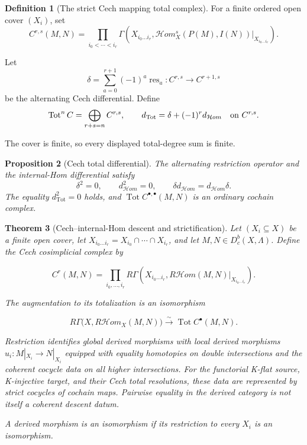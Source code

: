 \documentclass[10pt]{article}
\newtheorem{theorem}{Theorem}[section]
\newtheorem{proposition}[theorem]{Proposition}
\theoremstyle{definition}
\newtheorem{definition}[theorem]{Definition}
\newcommand{\Dbc}{D^b_c}
\begin{document}
\begin{definition}[The strict Cech mapping total complex]
For a finite ordered open cover \((X_i)\), set
\[
 C^{r,s}(M,N)=
 \prod_{i_0<\cdots<i_r}
 \Gamma\!\left(
 X_{i_0\ldots i_r},
 \mathcal Hom_X^s(P(M),I(N))|_{X_{i_0\ldots i_r}}
 \right).
\]

Let
\[
 \delta=\sum_{a=0}^{r+1}(-1)^a\operatorname{res}_a:
 C^{r,s}\longrightarrow C^{r+1,s}
\]
be the alternating Cech differential.  Define
\[
 \operatorname{Tot}^n C=
 \bigoplus_{r+s=n}C^{r,s},
 \qquad
 d_{\operatorname{Tot}}=\delta+(-1)^r d_{\mathcal Hom}
 \quad\hbox{on }C^{r,s}.
\]

The cover is finite, so every displayed total-degree sum is finite.
\end{definition}

\begin{proposition}[Cech total differential]
The alternating restriction operator and the internal-Hom differential
satisfy
\[
 \delta^2=0,\qquad d_{\mathcal Hom}^2=0,\qquad
 \delta d_{\mathcal Hom}=d_{\mathcal Hom}\delta.
\]
The equality \(d_{\operatorname{Tot}}^2=0\) holds, and
\(\operatorname{Tot}C^{\bullet,\bullet}(M,N)\) is an ordinary cochain complex.
\end{proposition}

\begin{theorem}[Cech--internal-Hom descent and strictification]
Let \((X_i\subseteq X)\) be a finite open cover, let
\(X_{i_0\ldots i_r}=X_{i_0}\cap\cdots\cap X_{i_r}\), and let
\(M,N\in\Dbc(X,\Lambda)\).  Define the Cech cosimplicial complex by

\[
 C^r(M,N)=
 \prod_{i_0,\ldots,i_r}
 R\Gamma\!\left(X_{i_0\ldots i_r},
 R\mathcal Hom(M,N)|_{X_{i_0\ldots i_r}}\right).
\]

The augmentation to its totalization is an isomorphism

\[
 R\Gamma\bigl(X,R\mathcal Hom_X(M,N)\bigr)
 \xrightarrow{\sim}\operatorname{Tot}C^\bullet(M,N).
\]

Restriction identifies global derived morphisms with local derived morphisms
\(u_i:M|_{X_i}\to N|_{X_i}\) equipped with equality homotopies on double
intersections and the coherent cocycle data on all higher intersections.  For
the functorial K-flat source, K-injective target, and their Cech total
resolutions, these data are represented by strict cocycles of cochain maps.
Pairwise equality in the derived category is not itself a coherent descent
datum.

A derived morphism is an isomorphism if its restriction to every \(X_i\) is
an isomorphism.
\end{theorem}
\end{document}
